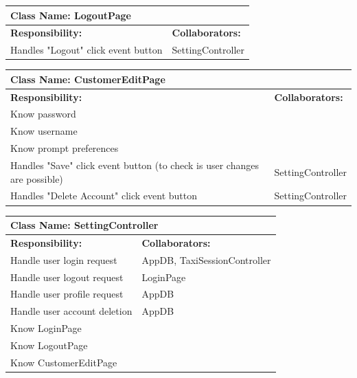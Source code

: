 \documentclass[]{article}
\begin{document}
\begin{table}[ht]
\centering
\begin{tabular}{|p{6cm}|p{6cm}|}
\hline 
 \multicolumn{2}{|l|}{\textbf{Class Name: LogoutPage}} \\
\hline
\textbf{Responsibility:} & \textbf{Collaborators:} \\
\hline 
Handles "Logout" click event button & SettingController\\ \hline
\end{tabular}
\end{table}


\begin{table}[ht]
\centering
\begin{tabular}{|p{6cm}|p{6cm}|}
\hline 
 \multicolumn{2}{|l|}{\textbf{Class Name: CustomerEditPage}} \\
\hline
\textbf{Responsibility:} & \textbf{Collaborators:} \\
\hline 
Know password & \\ \hline
Know username & \\ \hline
Know prompt preferences & \\ \hline
Handles "Save" click event button (to check is user changes are possible) & SettingController\\ \hline 
Handles "Delete Account" click event button & SettingController\\ \hline
\end{tabular}
\end{table}

\begin{table}[ht]
\centering
\begin{tabular}{|p{6cm}|p{6cm}|}
\hline 
 \multicolumn{2}{|l|}{\textbf{Class Name: SettingController}} \\
\hline
\textbf{Responsibility:} & \textbf{Collaborators:} \\
\hline
Handle user login request & AppDB, TaxiSessionController\\ \hline
Handle user logout request & LoginPage\\ \hline
Handle user profile request & AppDB\\ \hline
Handle user account deletion & AppDB\\ \hline
Know LoginPage & \\ \hline 
Know LogoutPage & \\ \hline
Know CustomerEditPage & \\ \hline
\end{tabular}
\end{table}
\end{document}
